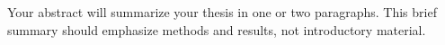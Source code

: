 

Your abstract will summarize your thesis in one or two paragraphs.  This brief summary should emphasize methods and results, not introductory material.
